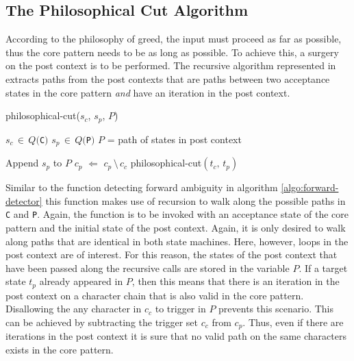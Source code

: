 \subsection{The Philosophical Cut Algorithm}

According to the philosophy of greed, the input
must proceed as far as possible, thus the core pattern needs to be 
as long as possible. To achieve this, a surgery on the post context
is to be performed. The recursive algorithm represented in  
extracts paths from the post contexts that are paths between two acceptance
states in the core pattern {\it and} have an iteration in the post context.

\begin{algorithm}
\caption{philosophical-cut($s_c$, $s_p$, $P$)}
\label{algo:philo-cut}
\begin{algorithmic}
    \REQUIRE $s_c\,\in\,Q(${\tt C}$)$
    \REQUIRE $s_p\,\in\,Q(${\tt P}$)$
    \REQUIRE $P$ = path of states in post context
    
                    \STATE Append $s_p$ to $P$ 
                    \STATE $c_p$ $\Leftarrow$ $c_p\,\setminus\,c_c$
                \ELSE 
                    \STATE philosophical-cut$(t_c,\,t_p)$
                \ENDIF
            \ENDIF
        \ENDFOR
    \ENDFOR
    \RETURN \FALSE
\end{algorithmic}
\end{algorithm}

Similar to the function detecting forward ambiguity in algorithm
\ref{algo:forward-detector} this function makes use of recursion to
walk along the possible paths in {\tt C} and {\tt P}. Again, the function is to
be invoked with an acceptance state of the core pattern and the initial state of
the post context. Again, it is only desired to walk along paths that are
identical in both state machines. Here, however, loops in the post context
are of interest. For this reason, the states of the post context that have been
passed along the recursive calls are stored in the variable $P$.  If a
target state $t_p$ already appeared in $P$, then this means that there
is an iteration in the post context on a character chain that is also valid in
the core pattern. Disallowing the any character in $c_c$ to trigger in $P$
prevents this scenario. This can be achieved by subtracting the trigger set
$c_c$ from $c_p$. Thus, even if there are iterations in the post context
it is sure that no valid path on the same characters exists in the core pattern.
    
